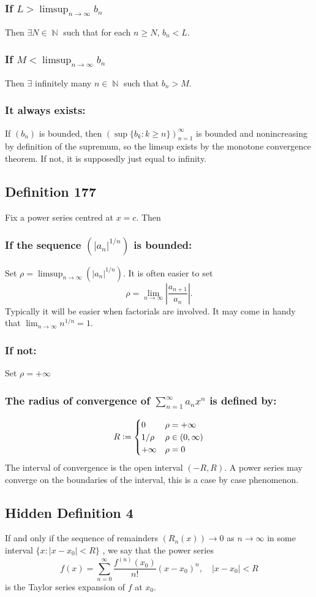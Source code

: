 \documentclass{article}
\DeclareMathOperator\N{\mathbb{N}}
\begin{document}
\subsubsection*{If $L > \limsup_{n \to \infty}b_n$}
Then $\exists N \in \N$ such that for each $n \geq N$, $b_n < L$.
\subsubsection*{If $M < \limsup_{n \to \infty}b_n$}
Then $\exists$ infinitely many $n \in \N$ such that $b_n > M$.
\subsubsection*{It always exists:}
If $(b_n)$ is bounded, then $(\sup \{b_k:k \geq n \})_{n=1}^{\infty}$ is bounded and
nonincreasing by definition of the supremum,
so the limsup exists by the monotone convergence theorem. If not, it is supposedly just equal to infinity.
\subsection{Definition 177}
Fix a power series centred at $x=c$. Then
\subsubsection*{If the sequence $(|a_n|^{1 \slash n})$
is bounded:}
Set $\rho = \limsup_{n \to \infty}(|a_n|^{1 \slash n})$. It is often easier to
set $$\rho = \lim_{n \to \infty} \left| \frac{a_{n+1}}{a_{n}} \right|. $$
Typically it will be easier when factorials are involved.
It may come in handy that $\lim_{n \to \infty} n ^ {1 \slash n} = 1$.
\subsubsection*{If not:}
Set $\rho = + \infty$
\subsubsection*{The radius of convergence of $\sum_{n=1}^{\infty}a_n x^n $ is defined by:}
$$
R \vcentcolon=
\begin{cases}
0 & \rho = + \infty \\
1 \slash \rho & \rho \in (0, \infty) \\
+ \infty & \rho = 0
\end{cases}
$$
The interval of convergence is the open interval $(-R,R)$. A power series may converge
on the boundaries of the interval, this is a case by case phenomenon.
\subsection{Hidden Definition 4}
If and only if the sequence of remainders $(R_n(x)) \to 0$ as $n \to \infty$ in some interval $\{x:|x-x_0|<R\}$ , we say that
the power series $$
f(x) = \sum_{n=0}^{\infty} \frac{f^{(n)}(x_0)}{n!}(x-x_0)^n, \quad |x-x_0|<R
$$
is the Taylor series expansion of $f$ at $x_0$.
\end{document}
